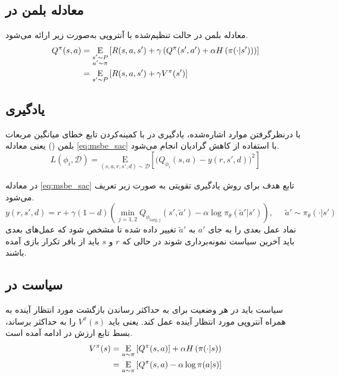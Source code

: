         
       \subsection{معادله بلمن در }
       معادله بلمن در حالت تنظیم‌شده با آنتروپی به‌صورت زیر ارائه می‌شود.
       \begin{align}
       	Q^{\pi}(s,a) &=\underset{\substack{s' \sim P \\ a' \sim \pi}}{\mathrm{E}} 
       	\left[
       	{R(s,a,s') + \gamma\left(Q^{\pi}(s',a') + \alpha H\left(\pi(\cdot|s')\right) \right)}
       	\right] \\
       	&= \underset{s' \sim P}{\mathrm{E}}\left[
       	{R(s,a,s') + \gamma V^{\pi}(s')}
       	\right]
       \end{align}
       
       \subsection{یادگیری }
                 با درنظرگرفتن موارد اشاره‌شده، یادگیری  در  با کمینه‌کردن تابع خطای میانگین مربعات بلمن () یعنی معادله \eqref{eq:msbe_sac} با استفاده از کاهش گرادیان
       انجام می‌شود.
       \begin{equation}
       	\label{eq:msbe_sac}
       	L(\phi_i, {\mathcal D}) = \underset{(s,a,r,s',d) \sim {\mathcal D}}{{\mathrm E}}\left[
       	\Bigg( Q_{\phi_i}(s,a) - y(r,s',d) \Bigg)^2
       	\right]
       \end{equation}
       
       
       در معادله 
       \eqref{eq:msbe_sac}
       تابع هدف برای روش یادگیری تقویتی 
       به صورت زیر تعریف می‌شود.
       \begin{equation}
       	y(r, s', d) = r + \gamma (1 - d) \left( \min_{j=1,2} Q_{\phi_{\text{targ},j}}(s', \tilde{a}') - \alpha \log \pi_{\theta}(\tilde{a}'|s') \right), \;\;\;\;\; \tilde{a}' \sim \pi_{\theta}(\cdot|s')
       \end{equation}
       نماد عمل بعدی را به جای 
       \(a'\)
        به
        \( \tilde{a}'\)
         تغییر داده شده تا مشخص شود که عمل‌های بعدی باید آخرین سیاست نمونه‌برداری شوند در حالی که 
          \(r\)
           و 
           \(s\)
            باید از بافر تکرار بازی آمده باشند.
            
            
          \subsection{سیاست در }
          سیاست باید در هر وضعیت برای به حداکثر رساندن بازگشت مورد انتظار آینده به همراه آنتروپی مورد انتظار آینده عمل کند. یعنی باید
           \(V^{\pi}(s)\)
            را به حداکثر برساند، بسط تابع ارزش در ادامه آمده است.
          \begin{align}
          	V^{\pi}(s) &= \underset{a \sim \pi}{\mathrm{E}}\left[
          	{Q^{\pi}(s,a)}
          	\right] + \alpha H\left(\pi(\cdot|s)\right) \\
          	&= \underset{a \sim \pi}{\mathrm{E}}\left[
          	{Q^{\pi}(s,a) - \alpha \log \pi(a|s)}
          	\right]
          \end{align}
          
